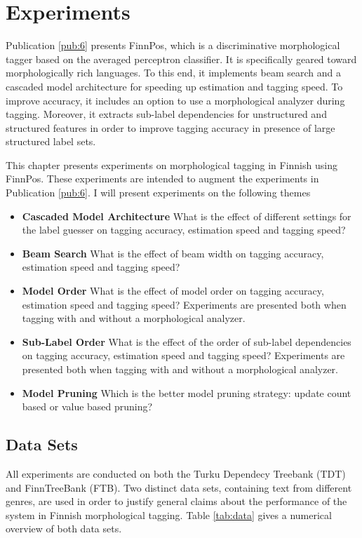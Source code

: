 \chapter{Experiments}
\label{chapter:finnpos}

Publication \ref{pub:6} presents FinnPos, which is a discriminative
morphological tagger based on the averaged perceptron classifier. It
is specifically geared toward morphologically rich languages. To this
end, it implements beam search and a cascaded model architecture for
speeding up estimation and tagging speed. To improve accuracy, it
includes an option to use a morphological analyzer during
tagging. Moreover, it extracts sub-label dependencies for unstructured
and structured features in order to improve tagging accuracy in presence of
large structured label sets.

This chapter presents experiments on morphological tagging in Finnish
using FinnPos. These experiments are intended to augment the
experiments in Publication \ref{pub:6}. I will present experiments on
the following themes

\begin{itemize}
\item {\bf Cascaded Model Architecture} What is the effect of different settings for the label guesser on tagging accuracy, estimation speed and tagging speed?
\item {\bf Beam Search} What is the effect of beam width on tagging accuracy, estimation speed and tagging speed?
\item {\bf Model Order} What is the effect of model order on tagging accuracy, estimation speed and tagging speed? Experiments are presented both when tagging with and without a morphological analyzer.
\item {\bf Sub-Label Order} What is the effect of the order of sub-label dependencies on tagging accuracy, estimation speed and tagging speed? Experiments are presented both when tagging with and without a morphological analyzer.
\item {\bf Model Pruning} Which is the better model pruning strategy: update count based or value based pruning?
\end{itemize}



\section{Data Sets}
All experiments are conducted on both the Turku Dependecy Treebank
\citep{Haverinen2013} (TDT) and FinnTreeBank \citep{Voutilainen2011}
(FTB). Two distinct data sets, containing text from different genres,
are used in order to justify general claims about the performance of
the system in Finnish morphological tagging. Table \ref{tab:data} gives a
numerical overview of both data sets.

